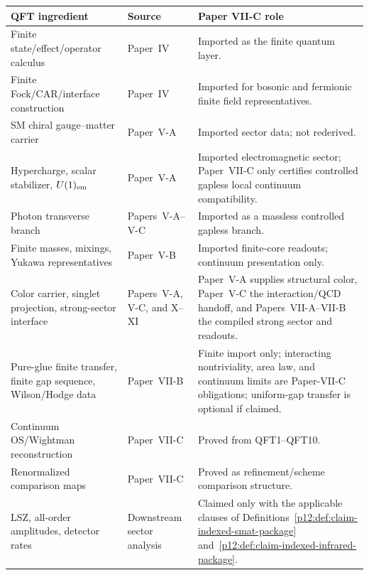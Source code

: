 \documentclass[12pt,a4paper]{article}
\begin{document}
\begin{center}
\small
\renewcommand{\arraystretch}{1.15}
\begin{tabularx}{\textwidth}{>{\raggedright\arraybackslash}p{}
                            >{\raggedright\arraybackslash}p{}
                            >{\raggedright\arraybackslash}X}
\toprule
\textbf{QFT ingredient} & \textbf{Source} & \textbf{Paper VII-C role} \\
\midrule
Finite state/effect/operator calculus & Paper~IV & Imported as the finite quantum layer. \\
Finite Fock/CAR/interface construction & Paper~IV & Imported for bosonic and fermionic finite field representatives. \\
SM chiral gauge--matter carrier & Paper~V-A & Imported sector data; not rederived. \\
Hypercharge, scalar stabilizer, \(U(1)_{\rm em}\) & Paper~V-A & Imported electromagnetic sector; Paper~VII-C only certifies controlled gapless local continuum compatibility. \\
Photon transverse branch & Papers~V-A--V-C & Imported as a massless controlled gapless branch. \\
Finite masses, mixings, Yukawa representatives & Paper~V-B & Imported finite-core readouts; continuum presentation only. \\
Color carrier, singlet projection, strong-sector interface & Papers~V-A, V-C, and X--XI & Paper~V-A supplies structural color, Paper~V-C the interaction/QCD handoff, and Papers~VII-A--VII-B the compiled strong sector and readouts. \\
Pure-glue finite transfer, finite gap sequence, Wilson/Hodge data & Paper~VII-B & Finite import only; interacting nontriviality, area law, and continuum limits are Paper-VII-C obligations; uniform-gap transfer is optional if claimed. \\
Continuum OS/Wightman reconstruction & Paper~VII-C & Proved from QFT1--QFT10. \\
Renormalized comparison maps & Paper~VII-C & Proved as refinement/scheme comparison structure. \\
LSZ, all-order amplitudes, detector rates & Downstream sector analysis & Claimed only with the applicable clauses of Definitions~\ref{p12:def:claim-indexed-smat-package} and~\ref{p12:def:claim-indexed-infrared-package}. \\
\bottomrule
\end{tabularx}
\end{center}
\end{document}
